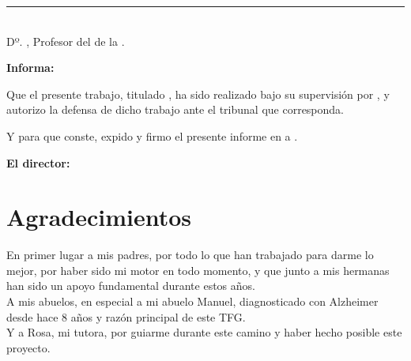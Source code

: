 \noindent\rule[-1ex]{\textwidth}{2pt}\\[4.5ex]

Dº. \textbf{\myProf}, Profesor del \myDepartment de la \myUni.

\vspace{0.5cm}

\textbf{Informa:}

\vspace{0.5cm}

Que el presente trabajo, titulado \textit{\textbf{\myTitle}},
ha sido realizado bajo su supervisión por \textbf{\myName}, y autorizo la defensa de dicho trabajo ante el tribunal
que corresponda.

\vspace{0.5cm}

Y para que conste, expido y firmo el presente informe en \myLocation a \myTime.

\vspace{1cm}

\textbf{El director:}

\vspace{5cm}

\noindent \textbf{\myProf}

\chapter*{Agradecimientos}
\thispagestyle{empty}

       \vspace{1cm}

En primer lugar a mis padres, por todo lo que han trabajado para darme lo mejor, por haber sido mi motor en todo momento,
y que junto a mis hermanas han sido un apoyo fundamental durante estos años. \\

A mis abuelos, en especial a mi abuelo Manuel, diagnosticado con Alzheimer desde hace 8 años y razón principal de este
TFG. \\

Y a Rosa, mi tutora, por guiarme durante este camino y haber hecho posible este proyecto. \\

